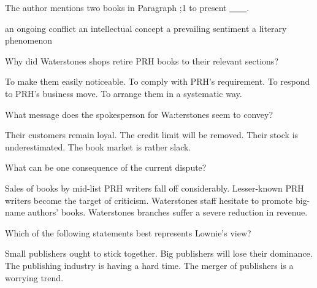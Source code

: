 \item The author mentions two books in Paragraph ;1 to present \uline{~~~~}.
\begin{tasks}
	\task an ongoing conflict
	\task an intellectual concept
	\task a prevailing sentiment
	\task a literary phenomenon
\end{tasks}
\item Why did Waterstones shops retire PRH books to their relevant sections?
\begin{tasks}
	\task To make them easily noticeable.
	\task To comply with PRH's requirement.
	\task To respond to PRH's business move.
	\task To arrange them in a systematic way.
\end{tasks}
\item What message does the spokesperson for Wa:terstones seem to convey?
\begin{tasks}
	\task Their customers remain loyal.
	\task The credit limit will be removed.
	\task Their stock is underestimated.
	\task The book market is rather slack.
\end{tasks}
\item What can be one consequence of the current dispute?
\begin{tasks}
	\task Sales of books by mid-list PRH writers fall off considerably.
	\task Lesser-known PRH writers become the target of criticism.
	\task Waterstones staff hesitate to promote big-name authors' books.
	\task Waterstones branches suffer a severe reduction in revenue.
\end{tasks}
\item Which of the following statements best represents Lownie's view?
\begin{tasks}
	\task Small publishers ought to stick together.
	\task Big publishers will lose their dominance.
	\task The publishing industry is having a hard time.
	\task The merger of publishers is a worrying trend.
\end{tasks}